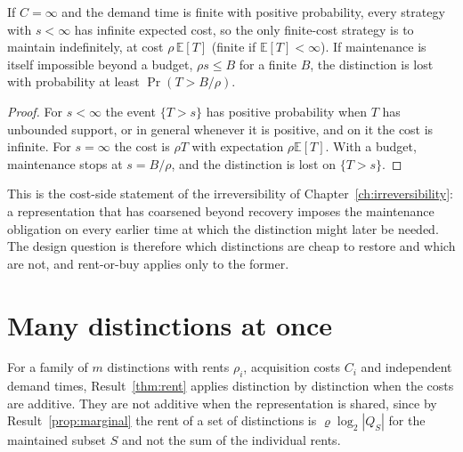 \begin{newresult}\label{prop:irrev-maint}
If $C=\infty$ and the demand time is finite with positive probability, every strategy with $s<\infty$ has infinite expected cost, so the only finite-cost strategy is to maintain indefinitely, at cost $\rho\,\mathbb E[T]$ (finite if $\mathbb E[T]<\infty$). If maintenance is itself impossible beyond a budget, $\rho s\le B$ for a finite $B$, the distinction is lost with probability at least $\Pr(T>B/\rho)$.
\end{newresult}
\begin{proof}
For $s<\infty$ the event $\{T>s\}$ has positive probability when $T$ has unbounded support, or in general whenever it is positive, and on it the cost is infinite. For $s=\infty$ the cost is $\rho T$ with expectation $\rho\mathbb E[T]$. With a budget, maintenance stops at $s=B/\rho$, and the distinction is lost on $\{T>s\}$.
\end{proof}

This is the cost-side statement of the irreversibility of Chapter~\ref{ch:irreversibility}: a representation that has coarsened beyond recovery imposes the maintenance obligation on every earlier time at which the distinction might later be needed. The design question is therefore which distinctions are cheap to restore and which are not, and rent-or-buy applies only to the former.

\section{Many distinctions at once}

For a family of $m$ distinctions with rents $\rho_i$, acquisition costs $C_i$ and independent demand times, Result~\ref{thm:rent} applies distinction by distinction when the costs are additive. They are not additive when the representation is shared, since by Result~\ref{prop:marginal} the rent of a set of distinctions is $\varrho\log_2|Q_S|$ for the maintained subset $S$ and not the sum of the individual rents.

